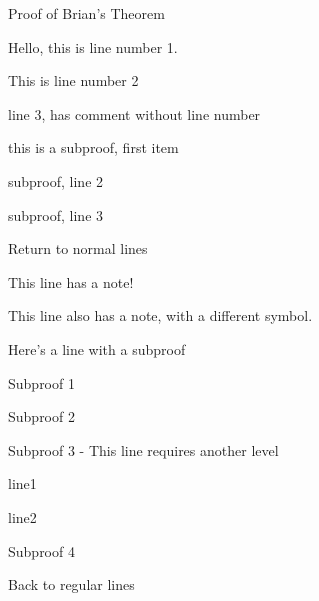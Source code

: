 \documentclass{homework}
\begin{document}
\maketitle


\begin{numproof}{Proof of Brian's Theorem}
	\item Hello, this is line number 1.
	\item This is line number 2
	\item line 3, has comment without line number 
	\begin{subproof}{1}
		\item this is a subproof, first item
		\item subproof, line 2 
		\item subproof, line 3 
	\end{subproof}
	\item Return to normal lines
	\item This line has a note! 
	\item This line also has a note, with a different symbol. 
	\item Here's a line with a subproof
		\begin{subproof}{1}
			\item Subproof 1
			\item Subproof 2
			\item Subproof 3 - This line requires another level
				\begin{subproof}{2}
					\item line1
					\item line2
				\end{subproof}
			\item Subproof 4
		\end{subproof}
	\item Back to regular lines
\end{numproof}


\end{document}

